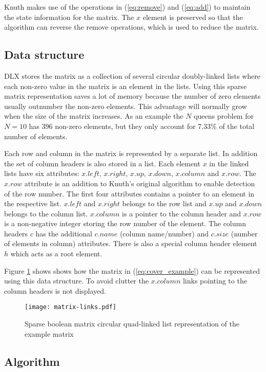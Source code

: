 Knuth makes use of the operations in (\ref{eq:remove}) and (\ref{eq:add}) to maintain the state information for the matrix.
The $x$ element is preserved so that the algorithm can reverse the remove operations, which is used to reduce the matrix.


\subsection{Data structure}
\label{dlx_struct}

DLX stores the matrix as a collection of several circular doubly-linked lists where each non-zero value in the matrix is an element in the lists.
Using this sparse matrix representation saves a lot of memory because the number of zero elements usually outnumber the non-zero elements.
This advantage will normally grow when the size of the matrix increases.
As an example the $N$ queens problem for $N=10$ has 396 non-zero elements, but they only account for 7.33\% of the total number of elements.

Each row and column in the matrix is represented by a separate list.
In addition the set of column headers is also stored in a list.
Each element $x$ in the linked lists have six attributes: $x.left$, $x.right$, $x.up$, $x.down$, $x.column$ and $x.row$.
The $x.row$ attribute is an addition to Knuth's original algorithm to enable detection of the row number.
The first four attributes contains a pointer to an element in the respective list.
$x.left$ and $x.right$ belongs to the row list and $x.up$ and $x.down$ belongs to the column list.
$x.column$ is a pointer to the column header and $x.row$ is a non-negative integer storing the row number of the element.
The column headers $c$ has the additional $c.name$ (column name/number) and $c.size$ (number of elements in column) attributes.
There is also a special column header element $h$ which acts as a root element.

Figure \ref{fig:matrix_links} shows shows how the matrix in (\ref{eq:cover_example}) can be represented using this data structure.
To avoid clutter the $x.column$ links pointing to the column headers is not displayed.
\begin{figure}[htbp]
	\centering
	\texttt{[image: matrix-links.pdf]}
	\caption{Sparse boolean matrix circular quad-linked list representation of the example matrix}
	\label{fig:matrix_links}
\end{figure}


\subsection{Algorithm}

